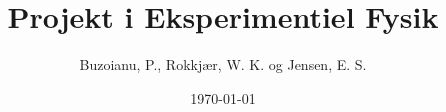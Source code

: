 \documentclass[a4paper,oneside,article]{memoir}
\author{Buzoianu, P., Rokkjær, W. K. og Jensen, E. S.}
\title{Projekt i Eksperimentiel Fysik}
\date{\today}
\begin{document}
    \frontmatter
    

    \tableofcontents*

    \mainmatter
    
    
    
    
    
    
    
    \backmatter
    \printbibliography
\end{document}
